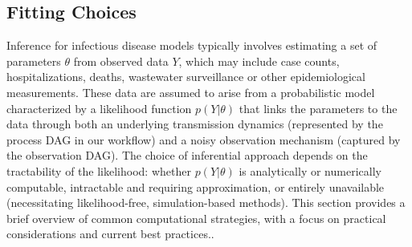 \documentclass{article}
\begin{document}
\subsection{Fitting Choices}\label{sec:fitting}

Inference for infectious disease models typically involves estimating a set of parameters $\theta$ from observed data $Y$, which may include case counts, hospitalizations, deaths, wastewater surveillance or other epidemiological measurements. These data are assumed to arise from a probabilistic model characterized by a likelihood function $p(Y | \theta)$ that links the parameters to the data through both an underlying transmission dynamics (represented by the process DAG in our workflow) and a noisy observation mechanism (captured by the observation DAG).  The choice of inferential approach depends on the tractability of the likelihood: 
whether $ p(Y | \theta)$ is analytically or numerically computable, intractable and requiring approximation, or entirely  unavailable (necessitating likelihood-free, simulation-based methods). This section provides a brief overview of common computational strategies, with a focus on practical considerations and current best practices.. 
\end{document}
